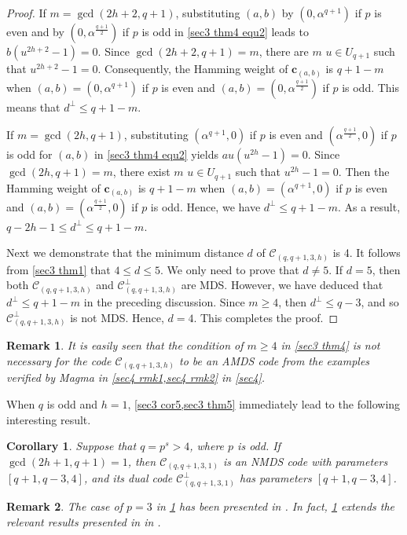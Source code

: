 \documentclass[10pt]{article}%
\newtheorem{corollary}{Corollary}
\newtheorem{remark}{Remark}%
\begin{document}
\begin{proof}
		If $m=\gcd(2h+2,q+1)$, substituting $(a,b)$ by $(0,\alpha^{q+1})$ if $p$ is even and by $(0,\alpha^{\frac{q+1}{2}})$ if $p$ is odd in \cref{sec3 thm4 equ2} leads to $b(u^{2h+2}-1)=0$. Since $\gcd(2h+2,q+1)=m$, there are $m$ $u \in U_{q+1}$ such that $u^{2h+2}-1=0$. Consequently, the Hamming weight of $\mathbf{c}_{(a,b)}$ is $q+1-m$ when $(a,b) = (0,\alpha^{q+1})$ if $p$ is even and $(a,b) = (0,\alpha^{\frac{q+1}{2}})$ if $p$ is odd. This means that $d^\perp \le q+1-m$.
		
		If $m=\gcd(2h,q+1)$, substituting $(\alpha^{q+1},0)$ if $p$ is even and $(\alpha^{\frac{q+1}{2}},0)$ if $p$ is odd for $(a,b)$ in \cref{sec3 thm4 equ2} yields $au(u^{2h}-1)=0$. Since $\gcd(2h,q+1)=m$, there exist $m$ $u \in U_{q+1}$ such that $u^{2h}-1=0$. Then the Hamming weight of $\mathbf{c}_{(a,b)}$ is $q+1-m$ when $(a,b) = (\alpha^{q+1},0)$ if $p$ is even and $(a,b) = (\alpha^{\frac{q+1}{2}},0)$ if $p$ is odd. Hence, we have $d^\perp \le q+1-m$. As a result, $q-2h-1 \le d^\perp \le q+1-m$.
		
		Next we demonstrate that the minimum distance $d$ of $\mathcal{C}_{(q,q+1,3,h)}$ is 4. It follows from \cref{sec3 thm1} that $4\le d\le5$. We only need to prove that $d\ne5$. If $d = 5$, then both $\mathcal{C}_{(q,q+1,3,h)}$ and $\mathcal{C}_{(q,q+1,3,h)}^\perp$ are MDS. However, we have deduced that $d^\perp \le q+1-m$ in the preceding discussion. Since $m\ge4$, then $d^\perp \le q-3$, and so $\mathcal{C}_{(q,q+1,3,h)}^\perp$ is not MDS. Hence, $d = 4$. This completes the proof.
	\end{proof}
	
	\begin{remark}\label{sec3 rmk3}
		It is easily seen that the condition of $m \ge 4$ in \cref{sec3 thm4} is not necessary for the code $\mathcal{C}_{(q,q+1,3,h)}$ to be an AMDS code from the examples verified by Magma in \cref{sec4 rmk1,sec4 rmk2} in \cref{sec4}.
	\end{remark}
	
	When $q$ is odd and $h=1$, \cref{sec3 cor5,sec3 thm5} immediately lead to the following interesting result.
	\begin{corollary}\label{sec3 cor6}
		Suppose that $q=p^s>4$, where $p$ is odd. If $\gcd(2h+1,q+1)=1$, then $\mathcal{C}_{(q,q+1,3,1)}$ is an NMDS code with parameters $[q+1,q-3,4]$, and its dual code $\mathcal{C}_{(q,q+1,3,1)}^\perp$ has parameters $[q+1,q-3,4]$.
	\end{corollary}
	\begin{remark}\label{sec3 rmk4}
		The case of $p=3$ in \cref{sec3 cor6} has been presented in \cite{Ding2020InfiniteFamiliesMDS}. In fact, \cref{sec3 cor6} extends the relevant results presented in in \cite{Ding2020InfiniteFamiliesMDS}.
	\end{remark}
	
\end{document}
